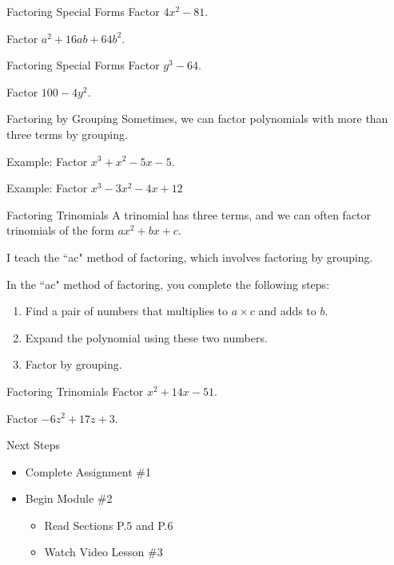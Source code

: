 \documentclass{beamer}
\begin{document}
\begin{frame}[t]{Factoring Special Forms}
Factor $4x^2 - 81$.

\pause \vfill

Factor $a^2 + 16ab + 64b^2$.
\end{frame}

\begin{frame}[t]{Factoring Special Forms}
Factor $g^3 - 64$.

\pause \vfill

Factor $100 - 4y^2$.
\end{frame}

\begin{frame}[t]{Factoring by Grouping}
Sometimes, we can factor polynomials with more than three terms by grouping.

Example: Factor $x^3 + x^2 - 5x - 5$.

\pause \vfill

Example: Factor $x^3 - 3x^2 - 4x + 12$
\end{frame}

\begin{frame}[t]{Factoring Trinomials}
A trinomial has three terms, and we can often factor trinomials of the form $ax^2 + bx + c$.

I teach the ``ac" method of factoring, which involves factoring by grouping. \pause

In the ``ac" method of factoring, you complete the following steps: \begin{enumerate}[1)]
	\item<3-> Find a pair of numbers that multiplies to $a\times c$ and adds to $b$.
	\item<4-> Expand the polynomial using these two numbers.
	\item<5> Factor by grouping.
\end{enumerate}
\end{frame}

\begin{frame}[t]{Factoring Trinomials}
Factor $x^2 + 14x - 51$.

\vfill \pause

Factor $-6z^2 + 17z + 3$.
\end{frame}

\begin{frame}[t]{Next Steps}
\begin{itemize}
\item Complete Assignment \#1
\item Begin Module \#2
\begin{itemize}
\item Read Sections P.5 and P.6
\item Watch Video Lesson \#3
\end{itemize}
\end{itemize}
\end{frame}
\end{document}
